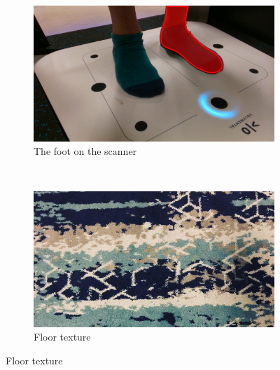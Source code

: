 \documentclass{kththesis}
\begin{document}
\begin{figure}[h]
    \centering
    \begin{subfigure}[b]{0.45\textwidth}
        \includegraphics[width=\textwidth]{on_scanner}
        \caption{The foot on the scanner}
        \label{fig:on_scanner}
    \end{subfigure}
    ~ %
    \begin{subfigure}[b]{0.45\textwidth}
        \includegraphics[width=\textwidth]{floor}
        \caption{Floor texture}
        \label{fig:texture}
      \end{subfigure}
      

\end{figure}
\end{document}

